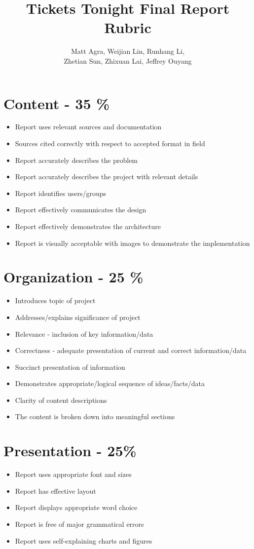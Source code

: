 \documentclass[]{article}
\title{Tickets Tonight Final Report Rubric}
\author{Matt Agra, Weijian Lin, Runhang Li, \\ Zhetian Sun, Zhixuan Lai, Jeffrey Ouyang}
\begin{document}
\maketitle

\section{Content - 35 \%}
  \begin{itemize}
  	\item Report uses relevant sources and documentation  
  	\item Sources cited correctly with respect to accepted format in field
    \item 	Report accurately describes the problem
  	\item Report accurately describes the project with relevant details
  	\item Report identifies users/groups
  	\item Report effectively communicates the design
  	\item Report effectively demonstrates the architecture
  	\item Report is visually acceptable with images to demonstrate the implementation
  \end{itemize}
  
\section{Organization - 25 \%}
 \begin{itemize}
   \item Introduces topic of project
   \item Addresses/explains significance of project
   \item Relevance - inclusion of key information/data
   \item Correctness - adequate presentation of current and correct information/data
   \item Succinct presentation of information
   \item Demonstrates appropriate/logical sequence of ideas/facts/data
   \item Clarity of content descriptions
   \item The content is broken down into meaningful sections
\end{itemize}

\section{Presentation - 25\%}
 \begin{itemize}
   \item Report uses appropriate font and sizes
   \item Report has effective layout
   \item Report displays appropriate word choice
   \item Report is free of major grammatical errors
   \item Report uses self-explaining charts and figures
\end{itemize}
\end{document}
